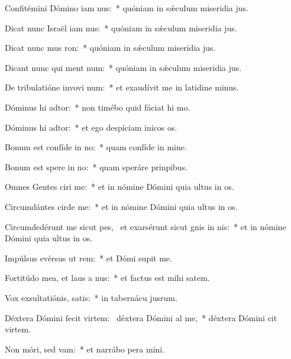 \item Confitémini Dómino iam nus:~* quóniam in sǽculum miseridia jus.
\item Dicat nunc Israël iam nus:~* quóniam in sǽculum miseridia jus.
\item Dicat nunc mus ron:~* quóniam in sǽculum miseridia jus.
\item Dicant nunc qui ment num:~* quóniam in sǽculum miseridia jus.
\item De tribulatióne invovi num:~* et exaudívit me in latidine minus.
\item Dóminus hi adtor:~* non timébo quid fáciat hi mo.
\item Dóminus hi adtor:~* et ego despíciam inicos os.
\item Bonum est confíde in no:~* quam confíde in mine.
\item Bonum est spere in no:~* quam speráre  prinpibus.
\item Omnes Gentes ciri me:~* et in nómine Dómini quia ultus  in os.
\item Circumdántes cirde me:~* et in nómine Dómini quia ultus  in os.
\item Circumdedérunt me sicut pes,~\pscross{} et exarsérunt sicut gnis in nis:~* et in nómine Dómini quia ultus  in os.
\item Impúlsus evérsus  ut rem:~* et Dómi supit me.
\item Fortitúdo mea, et laus a nus:~* et factus est mihi  satem.
\item Vox exsultatiónis,  satis:~* in tabernácu jusrum.
\item Déxtera Dómini fecit virtem:~\pscross{} déxtera Dómini al me,~* déxtera Dómini cit virtem.
\item Non móri, sed vam:~* et narrábo pera mini.
